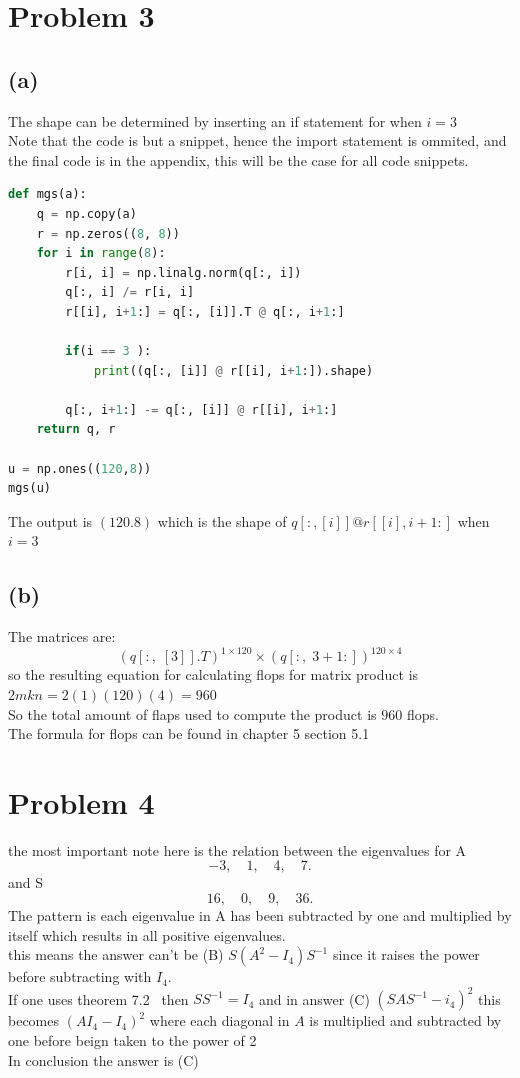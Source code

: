 \documentclass[12pt]{article}
\begin{document}
\section*{Problem 3}
\subsection*{(a)}
The shape can be determined by inserting an if statement for when $i = 3$\\
Note that the code is but a snippet, hence the import statement is ommited, and the final code is in the appendix, this will be the case for all code snippets.
\begin{lstlisting}[language=Python]
    def mgs(a):
    q = np.copy(a)
    r = np.zeros((8, 8))
    for i in range(8):
        r[i, i] = np.linalg.norm(q[:, i])
        q[:, i] /= r[i, i]
        r[[i], i+1:] = q[:, [i]].T @ q[:, i+1:]

        if(i == 3 ):
            print((q[:, [i]] @ r[[i], i+1:]).shape)

        q[:, i+1:] -= q[:, [i]] @ r[[i], i+1:]
    return q, r

u = np.ones((120,8))
mgs(u)
\end{lstlisting}
The output is $(120.8)$ which is the shape of $q[:, [i]] @ r[[i], i+1:]$ when $i = 3$

\subsection*{(b)}
The matrices are:
\[
(q[:,\; [3]].T)^{1 \times 120} \times (q[:,\; 3+1:])^{120 \times 4}
\]
so the resulting equation for calculating flops for matrix product is $2mkn = 2(1)(120)(4) = 960$\\
So the total amount of flaps used to compute the product is $960$ flops.\\
The formula for flops can be found in chapter 5 section 5.1~\cite{NUMLA}
\section*{Problem 4}
the most important note here is the relation between the eigenvalues for A
\[
-3, \quad 1, \quad 4, \quad 7.
\]
and S
\[
16, \quad 0, \quad 9, \quad 36.
\]
The pattern is each eigenvalue in A has been subtracted by one and multiplied by itself which results in all positive eigenvalues.\\
this means the answer can't be (B) $S(A^2-I_4)S^{-1}$ since it raises the power before subtracting with $I_4$.\\
If one uses theorem 7.2~\cite{NUMLA} then $SS^{-1} = I_4$ and in answer (C) $(SAS^{-1} - i_4)^2$ this becomes $(AI_4 -I_4)^2$ where each diagonal in $A$ is multiplied and subtracted by one before beign taken to the power of 2\\
In conclusion the answer is (C)
\end{document}
